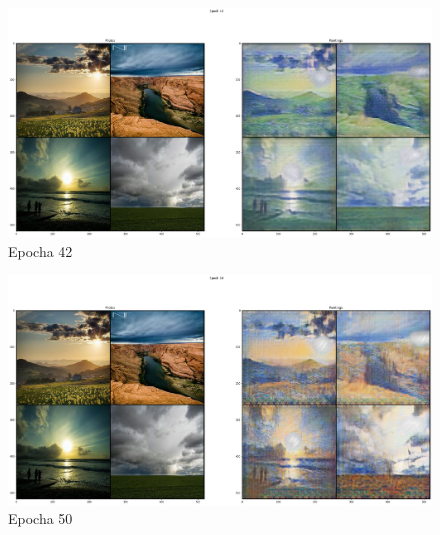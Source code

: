 \documentclass[czech]{mvi-report}
\begin{document}
\begin{figure}[h!]
  \centering\leavevmode
  \includegraphics[width=1\linewidth]{img/epochs/e42}\vskip-0.5cm
  \caption{Epocha 42}
  \label{fig:epoch-42}
\end{figure}

\begin{figure}[h!]
  \centering\leavevmode
  \includegraphics[width=1\linewidth]{img/epochs/e50}\vskip-0.5cm
  \caption{Epocha 50}
  \label{fig:epoch-50}
\end{figure}
\end{document}
